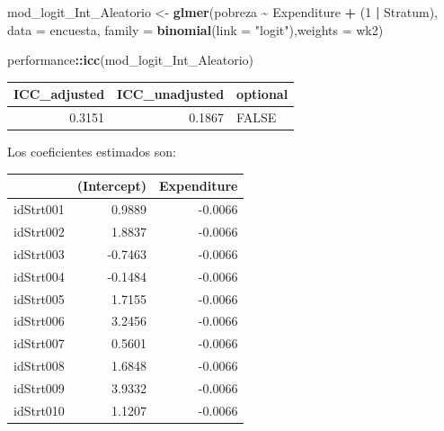 \documentclass[
  12pt,
]{book}
\newenvironment{Shaded}{\begin{snugshade}}{\end{snugshade}}
\newcommand{\AttributeTok}[1]{\textcolor[rgb]{0.13,0.29,0.53}{#1}}
\newcommand{\DataTypeTok}[1]{\textcolor[rgb]{0.13,0.29,0.53}{#1}}
\newcommand{\DecValTok}[1]{\textcolor[rgb]{0.00,0.00,0.81}{#1}}
\newcommand{\FunctionTok}[1]{\textcolor[rgb]{0.13,0.29,0.53}{\textbf{#1}}}
\newcommand{\NormalTok}[1]{#1}
\newcommand{\OtherTok}[1]{\textcolor[rgb]{0.56,0.35,0.01}{#1}}
\newcommand{\SpecialCharTok}[1]{\textcolor[rgb]{0.81,0.36,0.00}{\textbf{#1}}}
\newcommand{\StringTok}[1]{\textcolor[rgb]{0.31,0.60,0.02}{#1}}
\begin{document}
\begin{Shaded}
\begin{Highlighting}[]
\NormalTok{mod\_logit\_Int\_Aleatorio }\OtherTok{\textless{}{-}} \FunctionTok{glmer}\NormalTok{(pobreza }\SpecialCharTok{\textasciitilde{}}\NormalTok{ Expenditure  }\SpecialCharTok{+}\NormalTok{ (}\DecValTok{1} \SpecialCharTok{|}\NormalTok{ Stratum),}
  \AttributeTok{data =}\NormalTok{ encuesta, }\AttributeTok{family =} \FunctionTok{binomial}\NormalTok{(}\AttributeTok{link =} \StringTok{"logit"}\NormalTok{),}\AttributeTok{weights  =}\NormalTok{  wk2)}

\NormalTok{performance}\SpecialCharTok{::}\FunctionTok{icc}\NormalTok{(mod\_logit\_Int\_Aleatorio)}
\end{Highlighting}
\end{Shaded}

\begin{tabular}{r|r|l}
\hline
ICC\_adjusted & ICC\_unadjusted & optional\\
\hline
0.3151 & 0.1867 & FALSE\\
\hline
\end{tabular}

Los coeficientes estimados son:

\begin{Shaded}
\end{Shaded}

\begin{tabular}{l|r|r}
\hline
  & (Intercept) & Expenditure\\
\hline
idStrt001 & 0.9889 & -0.0066\\
\hline
idStrt002 & 1.8837 & -0.0066\\
\hline
idStrt003 & -0.7463 & -0.0066\\
\hline
idStrt004 & -0.1484 & -0.0066\\
\hline
idStrt005 & 1.7155 & -0.0066\\
\hline
idStrt006 & 3.2456 & -0.0066\\
\hline
idStrt007 & 0.5601 & -0.0066\\
\hline
idStrt008 & 1.6848 & -0.0066\\
\hline
idStrt009 & 3.9332 & -0.0066\\
\hline
idStrt010 & 1.1207 & -0.0066\\
\hline
\end{tabular}
\end{document}
